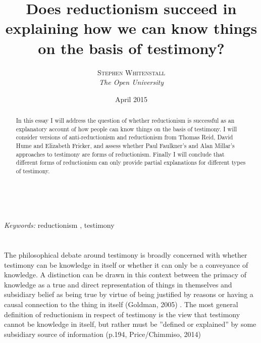\documentclass[a4paper, 11pt]{article} %
\title{\textbf{Does reductionism succeed in explaining how we can know things on the basis of testimony?}\\ %
}
\author{\textsc{Stephen Whitenstall} %
\\{\textit{The Open University}}} %
\date{April 2015}
\makeatletter
\renewcommand{\maketitle}{ %
\begin{flushright} %
{\LARGE\@title} %

\vspace{50pt} %

{\large\@author} %
\\\@date %

\vspace{40pt} %
\end{flushright}
}
\makeatother
\begin{document}
\maketitle %



\begin{abstract}
In this essay I will address the question of whether reductionism is successful as an explanatory account of how people can know things on the basis of testimony. I will consider versions of anti-reductionism and reductionism from Thomas Reid, David Hume and Elizabeth Fricker, and assess whether Paul Faulkner's and Alan Millar's approaches to testimony are forms of reductionism. Finally I will conclude that different forms of reductionism can only provide partial explanations for different types of testimony.
\end{abstract}

\hspace*{3,6mm}\textit{Keywords:} reductionism , testimony %

\vspace{30pt} %


\section*{}

The philosophical debate around testimony is broadly concerned with whether testimony can be knowledge in itself or whether it can only be a conveyance of knowledge. A distinction can be drawn in this context between the primacy of knowledge as a true and direct representation of things in themselves and subsidiary belief as being true by virtue of being justified by reasons or having a causal connection to the thing in itself (Goldman, 2005) \cite{Goldman:2005}. The most general definition of reductionism in respect of testimony is the view that testimony cannot be knowledge in itself, but rather must be ''defined or explained'' by some subsidiary source of information (p.194, Price/Chimmiso, 2014) \cite{Price/Chismisso:2014}
\end{document}
